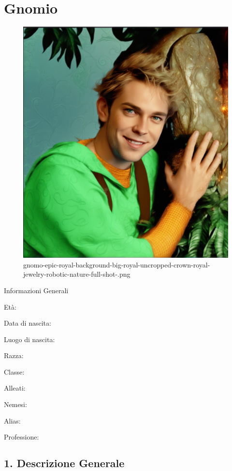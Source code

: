 \section{Gnomio}


\begin{figure}
\centering
\includegraphics{gnomo-epic-royal-background-big-royal-uncropped-crown-royal-jewelry-robotic-nature-full-shot-.png}
\caption{gnomo-epic-royal-background-big-royal-uncropped-crown-royal-jewelry-robotic-nature-full-shot-.png}
\end{figure}

Informazioni Generali

Età:

Data di nascita:

Luogo di nascita:

Razza:

Classe:

Alleati:

Nemesi:

Alias:

Professione:


\subsection{1. Descrizione Generale}\label{descrizione-generale}


